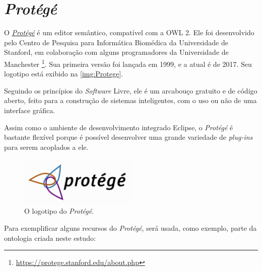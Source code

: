 \section{\textit{Protégé}}

O \href{https://protege.stanford.edu}{\textit{Protégé}} é um editor semântico, compatível com a OWL 2. Ele foi desenvolvido pelo Centro de Pesquisa para Informática Biomédica da Universidade de Stanford, em colaboração com alguns programadores da Universidade de Manchester \footnote{\url{https://protege.stanford.edu/about.php}}. Sua primeira versão foi lançada em 1999, e a atual é de 2017. Seu logotipo está exibido na \autoref{img:Protege}.

Seguindo os princípios do \textit{Software} Livre, ele é um arcabouço gratuito e de código aberto, feito para a construção de sistemas inteligentes, com o uso ou não de uma interface gráfica.

Assim como o ambiente de desenvolvimento integrado Eclipse, o \textit{Protégé} é bastante flexível porque é possível desenvolver uma grande variedade de \textit{plug-ins} para serem acoplados a ele.

\begin{figure}
	\centering
	\includegraphics[width=0.5\textwidth]{Capitulos/Ferramentas/protege}
	\caption{O logotipo do \textit{Protégé}.}
	\label{img:Protege}
\end{figure}

Para exemplificar alguns recursos do \textit{Protégé}, será usada, como exemplo, parte da ontologia criada neste estudo:

